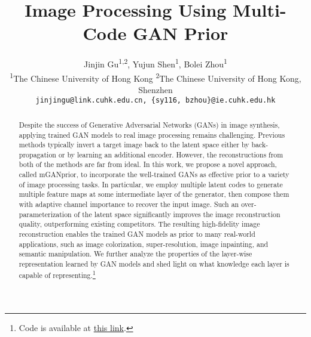 \documentclass[10pt,twocolumn,letterpaper]{article}
\begin{document}
\title{Image Processing Using Multi-Code GAN Prior}
\author{
  Jinjin Gu\textsuperscript{1,2},
  Yujun Shen\textsuperscript{1},
  Bolei Zhou\textsuperscript{1} \\
   \textsuperscript{1}The Chinese University of Hong Kong \quad
  \textsuperscript{2}The Chinese University of Hong Kong, Shenzhen \\
  {\tt\small
    jinjingu@link.cuhk.edu.cn,
    \{sy116, bzhou\}@ie.cuhk.edu.hk
  }
}


\twocolumn[{
\renewcommand\twocolumn[1][]{#1}
\maketitle
\begin{center}
  \vspace{-5pt}
  \texttt{[image: figures/teaser.pdf]}
  \vspace{-8pt}
  \captionsetup{type=figure,font=small}
  \caption{
    Multi-code GAN prior facilitates many image processing applications using the reconstruction from \emph{fixed} PGGAN \cite{pggan} models.
  }
  \label{fig:teaser}
  \vspace{2pt}
\end{center}
}]



\begin{abstract}
Despite the success of Generative Adversarial Networks (GANs) in image synthesis, applying trained GAN models to real image processing remains challenging.
Previous methods typically invert a target image back to the latent space either by back-propagation or by learning an additional encoder.
However, the reconstructions from both of the methods are far from ideal.
In this work, we propose a novel approach, called mGANprior, to incorporate the well-trained GANs as effective prior to a variety of image processing tasks.
In particular, we employ multiple latent codes to generate multiple feature maps at some intermediate layer of the generator, then compose them with adaptive channel importance to recover the input image.
Such an over-parameterization of the latent space significantly improves the image reconstruction quality, outperforming existing competitors.
The resulting high-fidelity image reconstruction enables the trained GAN models as prior to many real-world applications, such as image colorization, super-resolution, image inpainting, and semantic manipulation.
We further analyze the properties of the layer-wise representation learned by GAN models and shed light on what knowledge each layer is capable of representing.\footnote{Code is available at \href{https://genforce.github.io/mganprior/}{this link}.}
\end{abstract}
\end{document}

